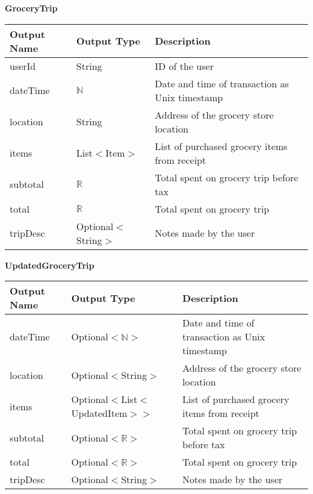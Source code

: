 \documentclass[12pt, titlepage]{article}
\begin{document}
\textbf{GroceryTrip}

\begin{table}[H]
  \begin{tabular}{|p{}|p{}|p{}|}
    \hline
    \textbf{Output Name} & \textbf{Output Type} & \textbf{Description} \\
    \hline
    userId & String & ID of the user \\
    \hline
    dateTime & $\mathbb{N}$ & Date and time of transaction as Unix timestamp \\
    \hline
    location & String & Address of the grocery store location \\
    \hline
    items & List$<$Item$>$ & List of purchased grocery items from receipt \\
    \hline
    subtotal & $\mathbb{R}$ & Total spent on grocery trip before tax \\
    \hline
    total & $\mathbb{R}$ & Total spent on grocery trip \\
    \hline
    tripDesc & Optional$<$String$>$ & Notes made by the user \\
    \hline
  \end{tabular}
\end{table}

\textbf{UpdatedGroceryTrip}

\begin{table}[H]
  \begin{tabular}{|p{}|p{}|p{}|}
    \hline
    \textbf{Output Name} & \textbf{Output Type} & \textbf{Description} \\
    \hline
    dateTime & Optional$<\mathbb{N}>$ & Date and time of transaction as Unix timestamp \\
    \hline
    location & Optional$<$String$>$ & Address of the grocery store location \\
    \hline
    items & Optional$<$List$<$UpdatedItem$>$$>$ & List of purchased grocery items from receipt \\
    \hline
    subtotal & Optional$<\mathbb{R}>$ & Total spent on grocery trip before tax \\
    \hline
    total & Optional$<\mathbb{R}>$ & Total spent on grocery trip \\
    \hline
    tripDesc & Optional$<$String$>$ & Notes made by the user \\
    \hline
  \end{tabular}
\end{table}
\end{document}
